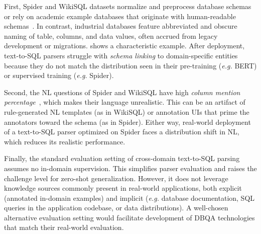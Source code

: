 \documentclass[11pt,a4paper]{article}
\newcommand{\eg}{\textit{e.g.}\xspace}
\begin{document}
First, Spider and WikiSQL datasets normalize and preprocess database schemas or rely on academic example databases that
originate with human-readable schemas~\cite{suhr2020exploring}.
In contrast, industrial databases feature abbreviated and obscure naming of table, columns, and data values, often
accrued from legacy development or migrations.
 shows a characteristic example.
After deployment, text-to-SQL parsers struggle with \emph{schema linking} to domain-specific entities because
they do not match the distribution seen in their pre-training (\eg BERT) or supervised training (\eg Spider).

Second, the NL questions of Spider and WikiSQL have high \emph{column mention
percentage}~\cite{deng2020structure}, which makes their language unrealistic.
This can be an artifact of rule-generated NL templates (as in WikiSQL) or annotation UIs that prime the
annotators toward the schema (as in Spider).
Either way, real-world deployment of a text-to-SQL parser optimized on Spider faces a
distribution shift in NL, which reduces its realistic performance.


Finally, the standard evaluation setting of cross-domain text-to-SQL parsing assumes no in-domain supervision.
This simplifies parser evaluation and raises the challenge level for zero-shot generalization.
However, it does not leverage knowledge sources commonly present in real-world applications, both explicit (annotated
in-domain examples) and implicit (\eg database documentation, SQL queries in the application
codebase, or data distributions).
A well-chosen alternative evaluation setting would facilitate development of DBQA technologies that match their
real-world evaluation.
\end{document}
